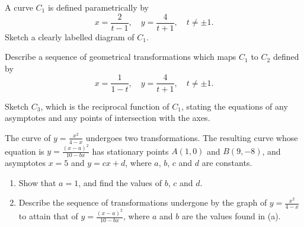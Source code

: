 \begin{problem}
    A curve $C_{1}$ is defined parametrically by \[x = \frac2{t-1}, \quad y = \frac{4}{t+1}, \quad t \neq \pm 1.\] Sketch a clearly labelled diagram of $C_{1}$.

    Describe a sequence of geometrical transformations which maps $C_{1}$ to $C_{2}$ defined by \[x = \frac1{1-t}, \quad y = \frac4{t+1}, \quad t \neq \pm 1.\]

    Sketch $C_{3}$, which is the reciprocal function of $C_{1}$, stating the equations of any asymptotes and any points of intersection with the axes.
\end{problem}

\begin{problem}[\chili]
    The curve of $y = \frac{x^2}{4-x}$ undergoes two transformations. The resulting curve whose equation is $y=\frac{(x-a)^2}{10-bx}$ has stationary points $A(1, 0)$ and $B(9,-8)$, and asymptotes $x=5$ and $y=cx+d$, where $a$, $b$, $c$ and $d$ are constants.

    \begin{figure}[H]
        \centering
    \end{figure}

    \begin{enumerate}
        \item Show that $a=1$, and find the values of $b$, $c$ and $d$.
        \item Describe the sequence of transformations undergone by the graph of $y= \frac{x^2}{4-x}$ to attain that of $y=\frac{(x-a)^2}{10-bx}$, where $a$ and $b$ are the values found in (a).
    \end{enumerate}
\end{problem}